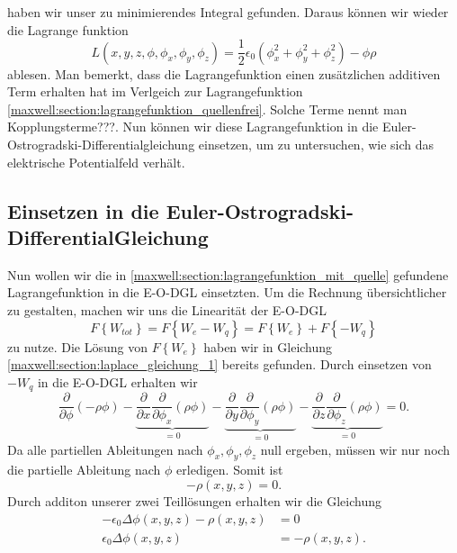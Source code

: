 haben wir unser zu minimierendes Integral gefunden.
Daraus können wir wieder die Lagrange funktion
\begin{equation}
L(x,y,z,\phi,\phi_x,\phi_y,\phi_z)
=
\frac{1}{2}\epsilon_0\left(\phi_x^2 + \phi_y^2 + \phi_z^2\right) - \phi\rho
\label{maxwell:section:lagrangefunktion_mit_quelle}
\end{equation}
ablesen.
Man bemerkt, dass die Lagrangefunktion einen zusätzlichen additiven Term erhalten hat im Verlgeich zur Lagrangefunktion \eqref{maxwell:section:lagrangefunktion_quellenfrei}.
Solche Terme nennt man Kopplungsterme???.
Nun können wir diese Lagrangefunktion in die Euler-Ostrogradski-Differentialgleichung einsetzen, um zu untersuchen, wie sich das elektrische Potentialfeld verhält.

\subsection{Einsetzen in die Euler-Ostrogradski-DifferentialGleichung}
Nun wollen wir die in \eqref{maxwell:section:lagrangefunktion_mit_quelle} gefundene Lagrangefunktion in die E-O-DGL einsetzten.
Um die Rechnung übersichtlicher zu gestalten, machen wir uns die Linearität der E-O-DGL
\begin{equation}
F\left\{W_{tot}\right\}
=
F\left\{W_e - W_q\right\}
=
F\left\{W_e\right\} + F\left\{-W_q\right\}
\label{maxwell:section:linearität_von_DGL}
\end{equation}
zu nutze.
Die Lösung von $F\left\{W_e\right\}$ haben wir in Gleichung \eqref{maxwell:section:laplace_gleichung_1} bereits gefunden.
Durch einsetzen von $-W_q$ in die E-O-DGL erhalten wir
\[
\frac{\partial}{\partial\phi}\left(-\rho\phi\right) - \underbrace{\frac{\partial}{\partial x}\frac{\partial}{\partial\phi_x}\left(\rho\phi\right)}_{=0} - \underbrace{\frac{\partial}{\partial y}\frac{\partial}{\partial\phi_y}\left(\rho\phi\right)}_{=0} - \underbrace{\frac{\partial}{\partial z}\frac{\partial}{\partial\phi_z}\left(\rho\phi\right)}_{=0}
=
0.
\]
Da alle partiellen Ableitungen nach $\phi_x, \phi_y, \phi_z$ null ergeben, müssen wir nur noch die partielle Ableitung nach $\phi$ erledigen.
Somit ist
\begin{equation}
-\rho(x,y,z)
=
0.
\end{equation}
Durch additon unserer zwei Teillösungen erhalten wir die Gleichung
\begin{align*}
-\epsilon_0\Delta\phi(x,y,z) - \rho(x,y,z)
&=
0
\\
\epsilon_0\Delta\phi(x,y,z)
&=
-\rho(x,y,z).
\end{align*}
